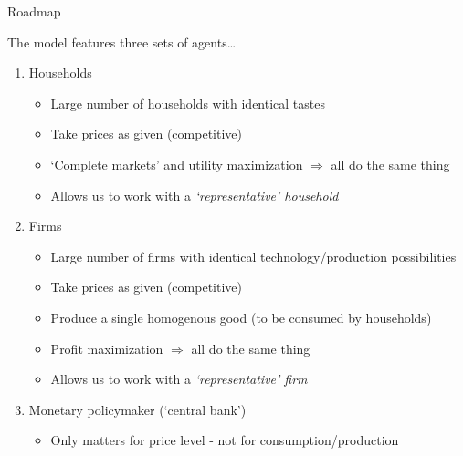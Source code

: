 
	
\begin{frame}{Roadmap}

The model features three sets of agents\ldots
\vspace{2mm}
\begin{enumerate}
\item	Households
	\begin{itemize}
	\item	Large number of households with identical tastes
	\item	Take prices as given (competitive)
	\item	`Complete markets' and utility maximization $\Rightarrow$ all do the same thing
	\item	Allows us to work with a \textit{`representative' household}
	\end{itemize}
\vspace{1mm}
\item	Firms
	\begin{itemize}
	\item	Large number of firms with identical technology/production possibilities
	\item	Take prices as given (competitive)
	\item	Produce a single homogenous good (to be consumed by households)
	\item	Profit maximization $\Rightarrow$ all do the same thing
	\item	Allows us to work with a \textit{`representative' firm}
	\end{itemize}
\vspace{1mm}	
\item	Monetary policymaker (`central bank')
	\begin{itemize}
	\item	Only matters for price level - not for consumption/production
	\end{itemize}
\end{enumerate}

\end{frame}


	
